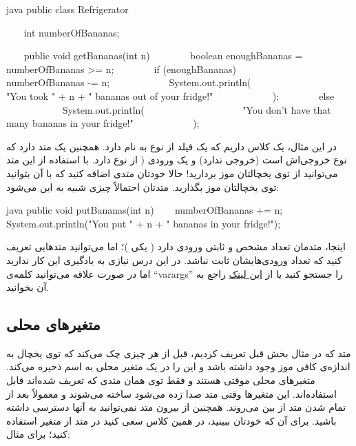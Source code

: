 \begin{codebox}{java}
public class Refrigerator {
    int numberOfBananas;

    public void getBananas(int n) {
        boolean enoughBananas = numberOfBananas >= n;
        if (enoughBananas) {
            numberOfBananas -= n;  
            System.out.println(
                    "You took " + n + " bananas out of your fridge!"
            );  
        } else {  
            System.out.println(
                    "You don't have that many bananas in your fridge!"
            );  
        }  
    }  
}
\end{codebox}

در این مثال، یک کلاس  داریم که یک فیلد از نوع
 به نام  دارد. همچنین یک
متد دارد که نوع خروجی‌اش  است (خروجی ندارد) و یک ورودی
(  از نوع  دارد. با استفاده از این متد
می‌\-توانید از توی یخچالتان موز بردارید! حالا خودتان متدی اضافه کنید که
با آن بتوانید توی یخچالتان موز بگذارید. متدتان احتمالاً چیزی شبیه به این
می‌شود:

\begin{codebox}{java}
public void putBananas(int n) {    
    numberOfBananas += n;  
    System.out.println("You put " + n + " bananas in your fridge!");  
}
\end{codebox}

اینجا، متدمان تعداد مشخص و ثابتی ورودی دارد ( یکی )؛ اما می‌\-توانید
متدهایی تعریف کنید که تعداد ورودی\-‌هایشان ثابت نباشد. در این درس نیازی
به یادگیری این کار ندارید اما در صورت علاقه می\-‌توانید کلمه‌ی ``varargs''
را جستجو کنید یا از
\href{https://www.geeksforgeeks.org/variable-arguments-varargs-in-java/}{این
لینک} راجع به آن بخوانید.

\subsection{متغیرهای محلی }

متد  که در مثال بخش قبل تعریف کردیم، قبل از هر
چیزی چک می‌\-کند که توی یخچال به اندازه‌ی کافی موز وجود داشته باشد و این
را در یک متغیر محلی به اسم  ذخیره می‌\-کند.
متغیرهای محلی موقتی هستند و فقط توی همان متدی که تعریف شده‌اند قابل
استفاده‌اند. این متغیرها وقتی متد صدا زده می‌شود ساخته می‌شوند و معمولاً بعد
از تمام شدن متد از بین می‌روند. همچنین از بیرون متد نمی‌توانید به آنها
دسترسی داشته باشید. برای آن که خودتان ببینید، در همین کلاس
 سعی کنید در متد  از
متغیر  استفاده کنید؛ برای مثال:

